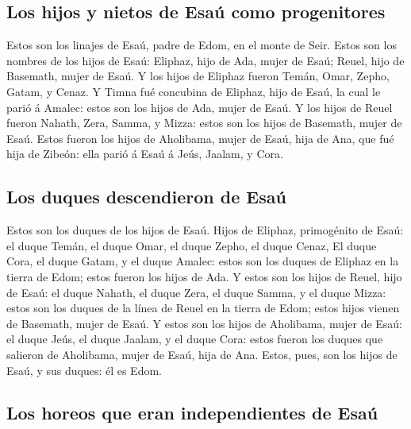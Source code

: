 \hypertarget{los-hijos-y-nietos-de-esauxfa-como-progenitores}{%
\subsection{Los hijos y nietos de Esaú como
progenitores}\label{los-hijos-y-nietos-de-esauxfa-como-progenitores}}

 Estos son los linajes de Esaú, padre de Edom, en el monte
de Seir.  Estos son los nombres de los hijos de Esaú:
Eliphaz, hijo de Ada, mujer de Esaú; Reuel, hijo de Basemath, mujer de
Esaú.  Y los hijos de Eliphaz fueron Temán, Omar, Zepho,
Gatam, y Cenaz.  Y Timna fué concubina de Eliphaz, hijo de
Esaú, la cual le parió á Amalec: estos son los hijos de Ada, mujer de
Esaú.  Y los hijos de Reuel fueron Nahath, Zera, Samma, y
Mizza: estos son los hijos de Basemath, mujer de Esaú. 
Estos fueron los hijos de Aholibama, mujer de Esaú, hija de Ana, que fué
hija de Zibeón: ella parió á Esaú á Jeús, Jaalam, y Cora.

\hypertarget{los-duques-descendieron-de-esauxfa}{%
\subsection{Los duques descendieron de
Esaú}\label{los-duques-descendieron-de-esauxfa}}

 Estos son los duques de los hijos de Esaú. Hijos de
Eliphaz, primogénito de Esaú: el duque Temán, el duque Omar, el duque
Zepho, el duque Cenaz,  El duque Cora, el duque Gatam, y el
duque Amalec: estos son los duques de Eliphaz en la tierra de Edom;
estos fueron los hijos de Ada.  Y estos son los hijos de
Reuel, hijo de Esaú: el duque Nahath, el duque Zera, el duque Samma, y
el duque Mizza: estos son los duques de la línea de Reuel en la tierra
de Edom; estos hijos vienen de Basemath, mujer de Esaú.  Y
estos son los hijos de Aholibama, mujer de Esaú: el duque Jeús, el duque
Jaalam, y el duque Cora: estos fueron los duques que salieron de
Aholibama, mujer de Esaú, hija de Ana.  Estos, pues, son
los hijos de Esaú, y sus duques: él es Edom.

\hypertarget{los-horeos-que-eran-independientes-de-esauxfa}{%
\subsection{Los horeos que eran independientes de
Esaú}\label{los-horeos-que-eran-independientes-de-esauxfa}}

